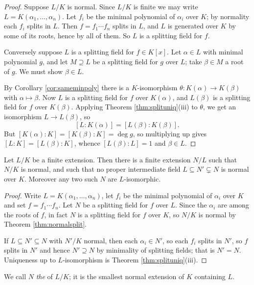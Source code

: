 \begin{proof}
	Suppose $L/K$ is normal. Since $L/K$ is finite we may write $L = K(\alpha_1, \dots, \alpha_n)$. Let $f_i$ be the minimal polynomial of $\alpha_i$ over $K$; by normality each $f_i$ splits in $L$. Then $f = f_1 \cdots f_n$ splits in $L$, and $L$ is generated over $K$ by some of its roots, hence by all of them. So $L$ is a splitting field for $f$.

	Conversely suppose $L$ is a splitting field for $f \in K[x]$. Let $\alpha \in L$ with minimal polynomial $g$, and let $M \supseteq L$ be a splitting field for $g$ over $L$; take $\beta \in M$ a root of $g$. We must show $\beta \in L$.

	By Corollary \ref{cor:sameminpoly} there is a $K$-isomorphism $\theta : K(\alpha) \to K(\beta)$ with $\alpha \mapsto \beta$. Now $L$ is a splitting field for $f$ over $K(\alpha)$, and $L(\beta)$ is a splitting field for $f$ over $K(\beta)$. Applying Theorem \ref{thm:splituniq}(iii) to $\theta$, we get an isomorphism $L \to L(\beta)$, so
	$$[L : K(\alpha)] = [L(\beta):K(\beta)].$$
	But $[K(\alpha):K] = [K(\beta):K] = \deg g$, so multiplying up gives $[L:K] = [L(\beta):K]$, whence $[L(\beta):L] = 1$ and $\beta \in L$.
\end{proof}

\begin{corollary}\label{cor:normalclosure}
	Let $L/K$ be a finite extension. Then there is a finite extension $N/L$ such that $N/K$ is normal, and such that no proper intermediate field $L \subseteq N' \subsetneq N$ is normal over $K$. Moreover any two such $N$ are $L$-isomorphic.
\end{corollary}

\begin{proof}
	Write $L = K(\alpha_1, \dots, \alpha_n)$, let $f_i$ be the minimal polynomial of $\alpha_i$ over $K$ and set $f = f_1\cdots f_n$. Let $N$ be a splitting field for $f$ over $L$. Since the $\alpha_i$ are among the roots of $f$, in fact $N$ is a splitting field for $f$ over $K$, so $N/K$ is normal by Theorem \ref{thm:normalsplit}.

	If $L \subseteq N' \subseteq N$ with $N'/K$ normal, then each $\alpha_i \in N'$, so each $f_i$ splits in $N'$, so $f$ splits in $N'$ and hence $N' \supseteq N$ by minimality of splitting fields; that is $N' = N$. Uniqueness up to $L$-isomorphism is Theorem \ref{thm:splituniq}(iii).
\end{proof}

We call $N$ \emph{the}  of $L/K$; it is the smallest normal extension of $K$ containing $L$.


